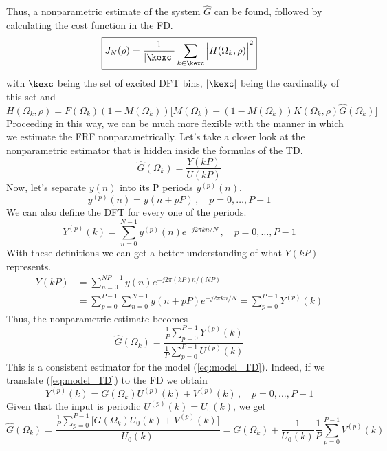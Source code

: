 \newpage
Thus, a nonparametric estimate of the system $\hat{G}$ can be found, followed by calculating the cost function in the FD.
\begin{equation}
\boxed{
    J_N(\rho) = \frac{1}{|\kexc|}\sum_{k \in \kexc} \Big|H(\Omega_k,\rho)\Big|^2
\label{eq:JFD}
}
\end{equation} 
with $\kexc$ being the set of excited DFT bins, $|\kexc|$ being the cardinality of this set and
\begin{equation}
    H(\Omega_k,\rho) = F(\Omega_k)(1-M(\Omega_k)) \Big[M(\Omega_k)-(1-M(\Omega_k))K(\Omega_k,\rho) \hat{G}(\Omega_k)\Big]
\end{equation}
Proceeding in this way, we can be much more flexible with the manner in which we estimate the FRF nonparametrically. Let's take a closer look at the nonparametric estimator that is hidden inside the formulas of the TD.
\begin{equation*}
    \hat G(\Omega_k) = \frac{Y(kP)}{U(kP)}
\end{equation*}
Now, let's separate $y(n)$ into its P periods $y^{(p)}(n)$.
\begin{equation*}
    y^{(p)}(n) = y(n+pP) \,,\quad p = 0,\ldots,P-1
\end{equation*}
We can also define the DFT for every one of the periods.
\begin{equation*}
    Y^{(p)}(k) = \sum_{n=0}^{N-1} y^{(p)}(n) e^{-j2\pi kn/N} \,,\quad p = 0,\ldots,P-1
\end{equation*}
With these definitions we can get a better understanding of what $Y(kP)$ represents.
\begin{align*}
    Y(kP) &= \sum_{n=0}^{N\!P-1} y(n) e^{-j2\pi (kP) n/(N\!P)}\\
    &= \sum_{p=0}^{P-1}  \sum_{n=0}^{N-1} y(n+pP) e^{-j2\pi kn/N} = \sum_{p=0}^{P-1} Y^{(p)}(k)
\end{align*}
Thus, the nonparametric estimate becomes
\begin{equation*}
    \hat G(\Omega_k) = \frac{\frac{1}{P}\sum_{p=0}^{P-1}  Y^{(p)}(k)}{\frac{1}{P}\sum_{p=0}^{P-1}  U^{(p)}(k)}
\end{equation*}
This is a consistent estimator for the model (\ref{eq:model_TD}). Indeed, if we translate (\ref{eq:model_TD}) to the FD we obtain
\begin{equation*}
    Y^{(p)}(k) = G(\Omega_k) U^{(p)}(k) + V^{(p)}(k) \,,\quad p = 0,\ldots,P-1
\end{equation*}
Given that the input is periodic $U^{(p)}(k) = U_0(k)$, we get
\begin{equation*}
    \hat G(\Omega_k) = \frac{\frac{1}{P}\sum_{p=0}^{P-1} \Big [ G(\Omega_k) U_0(k) + V^{(p)}(k) \Big ]}{U_0(k)} = G(\Omega_k) + \frac{1}{U_0(k)} \frac{1}{P}\sum_{p=0}^{P-1} V^{(p)}(k)
\end{equation*}

